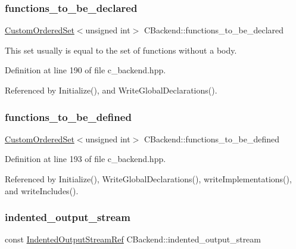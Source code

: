 \subsubsection{\texorpdfstring{functions\+\_\+to\+\_\+be\+\_\+declared}{functions\_to\_be\_declared}}
{\footnotesize\ttfamily \hyperlink{classCustomOrderedSet}{Custom\+Ordered\+Set}$<$unsigned int$>$ C\+Backend\+::functions\+\_\+to\+\_\+be\+\_\+declared\hspace{0.3cm}{\ttfamily [private]}}



This set usually is equal to the set of functions without a body. 



Definition at line 190 of file c\+\_\+backend.\+hpp.



Referenced by Initialize(), and Write\+Global\+Declarations().

\mbox{\label{classCBackend_adbc767949e8531de9f3d49f4fa4a6533}} 
\subsubsection{\texorpdfstring{functions\+\_\+to\+\_\+be\+\_\+defined}{functions\_to\_be\_defined}}
{\footnotesize\ttfamily \hyperlink{classCustomOrderedSet}{Custom\+Ordered\+Set}$<$unsigned int$>$ C\+Backend\+::functions\+\_\+to\+\_\+be\+\_\+defined\hspace{0.3cm}{\ttfamily [private]}}



Definition at line 193 of file c\+\_\+backend.\+hpp.



Referenced by Initialize(), Write\+Global\+Declarations(), write\+Implementations(), and write\+Includes().

\mbox{\label{classCBackend_a80c09865e76c594c3ad883da02d87abc}} 
\subsubsection{\texorpdfstring{indented\+\_\+output\+\_\+stream}{indented\_output\_stream}}
{\footnotesize\ttfamily const \hyperlink{indented__output__stream_8hpp_ab32278e11151ef292759c88e99b77feb}{Indented\+Output\+Stream\+Ref} C\+Backend\+::indented\+\_\+output\+\_\+stream\hspace{0.3cm}{\ttfamily [protected]}}



